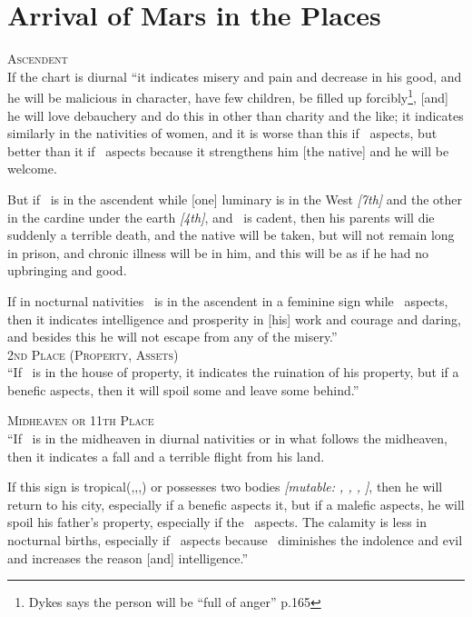 \section{Arrival of Mars in the Places}

\textsc{Ascendent} \hfill \\
\indent If the chart is diurnal ``it indicates misery and pain and decrease in his good, and he will be malicious in character, have few children, be filled up forcibly\footnote{Dykes says the person will be ``full of anger'' p.165}, [and] he will love debauchery and do this in other than charity and the like; it indicates similarly in the nativities of women, and it is worse than this if \Saturn\, aspects, but better than it if \Jupiter\, aspects because it strengthens him [the native] and he will be welcome.

But if \Mars\, is in the ascendent while [one] luminary is in the West \textsl{[7th]} and the other in the cardine under the earth \textsl{[4th]}, and \Jupiter\, is cadent, then his parents will die suddenly a terrible death, and the native will be taken, but will not remain long in prison, and chronic illness will be in him, and this will be as if he had no upbringing and good.

If in nocturnal nativities \Mars\, is in the ascendent in a feminine sign while \Jupiter\, aspects, then it indicates intelligence and prosperity in [his] work and courage and daring, and besides this he will not escape from any of the misery.'' \\

\noindent\textsc{2nd Place (Property, Assets)} \hfill \\
\indent ``If \Mars\, is in the house of property, it indicates the ruination of his property, but if a benefic aspects, then it will spoil some and leave some behind.''

\noindent\textsc{Midheaven or 11th Place} \hfill \\
``If \Mars\, is in the midheaven in diurnal nativities or in what follows the midheaven, then it indicates a fall and a terrible flight from his land. 

If this sign is tropical(\Aries,\Cancer,\Libra,\Capricorn) or possesses two bodies \textsl{[mutable: \Gemini, \Virgo, \Sagittarius, \Pisces]}, then he will return to his city, especially if a benefic aspects it, but if a malefic aspects, he will spoil his father's property, especially if the \Sun\, aspects. The calamity is less in nocturnal births, especially if \Jupiter\, aspects because \Jupiter\, diminishes the indolence and evil and increases the reason [and] intelligence.''

